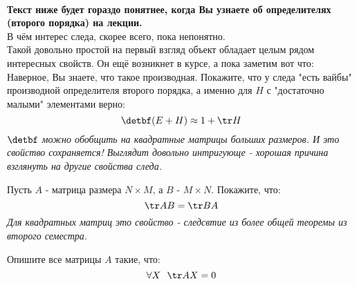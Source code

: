 	\begin{problem} 
		\textbf{\\Текст ниже будет гораздо понятнее, когда Вы узнаете об определителях (второго порядка) на лекции.} \\
		В чём интерес следа, скорее всего, пока непонятно. \\
		Такой довольно простой на первый взгляд объект обладает целым рядом интересных свойств. Он ещё возникнет в курсе, а пока заметим вот что: \\
		Наверное, Вы знаете, что такое производная. Покажите, что у следа "есть вайбы" производной определителя второго порядка, а именно для $H$ с "достаточно малыми" элементами верно:
		$$ \detbf (E + H) \approx 1 + \tr H$$
		\textit{$\detbf$ можно обобщить на квадратные матрицы больших размеров. И это свойство сохраняется! Выглядит довольно интригующе - хорошая причина взглянуть на другие свойства следа.}
	\end{problem}

	\begin{problem}
		Пусть $A$ - матрица размера $N \times M$, а $B$ - $M \times N$. Покажите, что:
		$$\tr AB = \tr BA$$
		\textit{Для квадратных матриц это свойство - следсвтие из более общей теоремы из второго семестра.}
	\end{problem}
	
	\begin{problem} [Г7.12]
		Опишите все матрицы $A$ такие, что:
		$$ \forall X \ \ \tr AX = 0 $$
	\end{problem}


